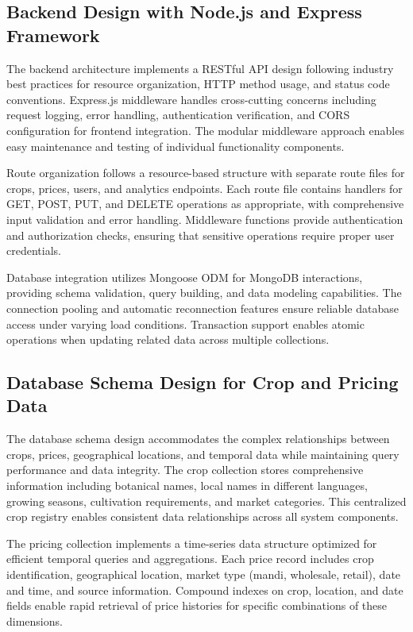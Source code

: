 \subsection{Backend Design with Node.js and Express Framework}

The backend architecture implements a RESTful API design following industry best practices for resource organization, HTTP method usage, and status code conventions. Express.js middleware handles cross-cutting concerns including request logging, error handling, authentication verification, and CORS configuration for frontend integration. The modular middleware approach enables easy maintenance and testing of individual functionality components.

Route organization follows a resource-based structure with separate route files for crops, prices, users, and analytics endpoints. Each route file contains handlers for GET, POST, PUT, and DELETE operations as appropriate, with comprehensive input validation and error handling. Middleware functions provide authentication and authorization checks, ensuring that sensitive operations require proper user credentials.

Database integration utilizes Mongoose ODM for MongoDB interactions, providing schema validation, query building, and data modeling capabilities. The connection pooling and automatic reconnection features ensure reliable database access under varying load conditions. Transaction support enables atomic operations when updating related data across multiple collections.

\subsection{Database Schema Design for Crop and Pricing Data}

The database schema design accommodates the complex relationships between crops, prices, geographical locations, and temporal data while maintaining query performance and data integrity. The crop collection stores comprehensive information including botanical names, local names in different languages, growing seasons, cultivation requirements, and market categories. This centralized crop registry enables consistent data relationships across all system components.

The pricing collection implements a time-series data structure optimized for efficient temporal queries and aggregations. Each price record includes crop identification, geographical location, market type (mandi, wholesale, retail), date and time, and source information. Compound indexes on crop, location, and date fields enable rapid retrieval of price histories for specific combinations of these dimensions.

